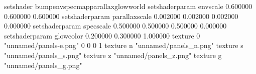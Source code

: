setshader bumpenvspecmapparallaxglowworld
setshaderparam envscale 0.600000 0.600000 0.600000
setshaderparam parallaxscale 0.002000 0.002000 0.002000 0.000000
setshaderparam specscale 0.500000 0.500000 0.500000 0.000000
setshaderparam glowcolor 0.200000 0.300000 1.000000
texture 0 "unnamed/panels-e.png" 0 0 0 1
texture n "unnamed/panels_n.png"
texture s "unnamed/panels_s.png"
texture z "unnamed/panels_z.png"
texture g "unnamed/panels_g.png"